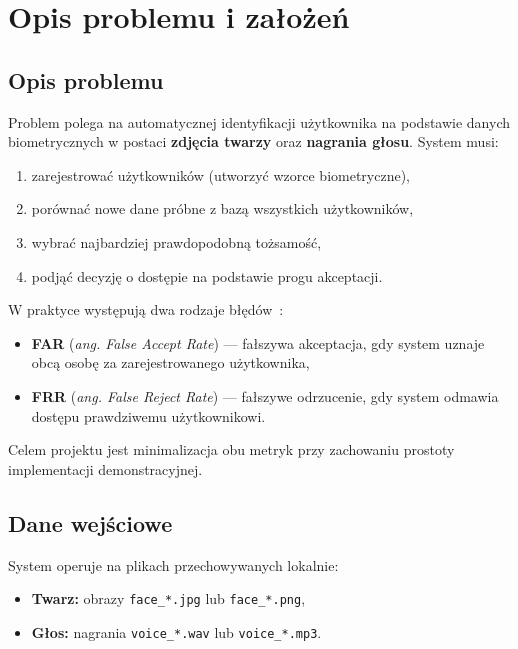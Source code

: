 \chapter{Opis problemu i założeń}
\label{cha:problem}

\section{Opis problemu}

Problem polega na automatycznej identyfikacji użytkownika na podstawie danych biometrycznych w postaci \textbf{zdjęcia twarzy} oraz \textbf{nagrania głosu}. System musi:
\begin{enumerate}
    \item zarejestrować użytkowników (utworzyć wzorce biometryczne),
    \item porównać nowe dane próbne z bazą wszystkich użytkowników,
    \item wybrać najbardziej prawdopodobną tożsamość,
    \item podjąć decyzję o dostępie na podstawie progu akceptacji.
\end{enumerate}

W praktyce występują dwa rodzaje błędów~\cite{jain2004multimodal}:
\begin{itemize}
    \item \textbf{FAR} (\emph{ang. False Accept Rate}) --- fałszywa akceptacja, gdy system uznaje obcą osobę za zarejestrowanego użytkownika,
    \item \textbf{FRR} (\emph{ang. False Reject Rate}) --- fałszywe odrzucenie, gdy system odmawia dostępu prawdziwemu użytkownikowi.
\end{itemize}

Celem projektu jest minimalizacja obu metryk przy zachowaniu prostoty implementacji demonstracyjnej.

\section{Dane wejściowe}

System operuje na plikach przechowywanych lokalnie:
\begin{itemize}
    \item \textbf{Twarz:} obrazy \texttt{face\_*.jpg} lub \texttt{face\_*.png},
    \item \textbf{Głos:} nagrania \texttt{voice\_*.wav} lub \texttt{voice\_*.mp3}.
\end{itemize}

